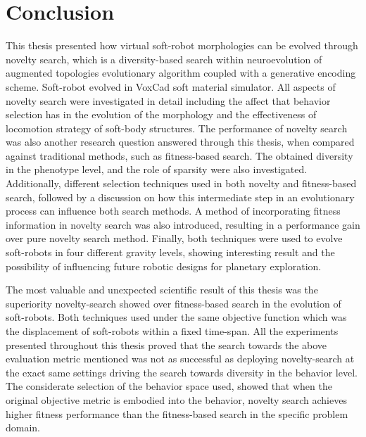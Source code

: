 
\chapter{Conclusion} %

\label{Conclusion} %


This thesis presented how virtual soft-robot morphologies can be evolved through novelty search, which is a diversity-based search within neuroevolution of augmented topologies evolutionary algorithm coupled with a generative encoding scheme. Soft-robot evolved in VoxCad soft material simulator. All aspects of novelty search were investigated in detail including the affect that behavior selection has in the evolution of the morphology and the effectiveness of locomotion strategy of soft-body structures. The performance of novelty search was also another research question answered through this thesis, when compared against traditional methods, such as fitness-based search. The obtained diversity in the phenotype level, and the role of sparsity were also investigated. Additionally, different selection techniques used in both novelty and fitness-based search, followed by a discussion on how this intermediate step in an evolutionary process can influence both search methods. A method of incorporating fitness information in novelty search was also introduced, resulting in a performance gain over pure novelty search method. Finally, both techniques were used to evolve soft-robots in four different gravity levels, showing interesting result and the possibility of influencing future robotic designs for planetary exploration.

The most valuable and unexpected scientific result of this thesis was the superiority novelty-search showed over fitness-based search in the evolution of soft-robots. Both techniques used under the same objective function which was the displacement of soft-robots within a fixed time-span. All the experiments presented throughout this thesis proved that the search towards the above evaluation metric mentioned was not as successful as deploying novelty-search at the exact same settings driving the search towards diversity in the behavior level. The considerate selection of the behavior space used, showed that when the original objective metric is embodied into the behavior, novelty search achieves higher fitness performance than the fitness-based search in the specific problem domain.

